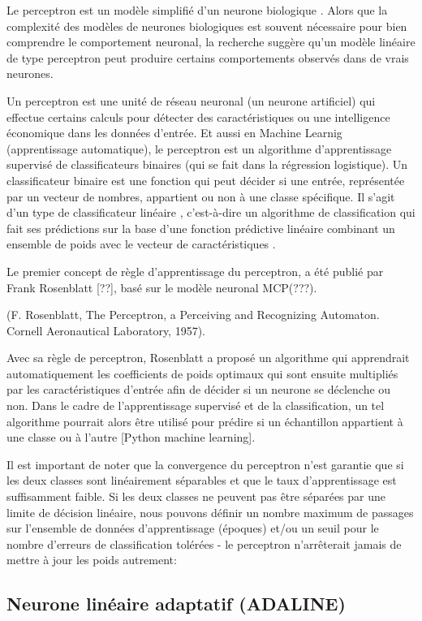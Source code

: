 	Le perceptron est un modèle simplifié d'un neurone biologique . Alors que la complexité des modèles de neurones biologiques est souvent nécessaire pour bien comprendre le comportement neuronal, la recherche suggère qu'un modèle linéaire de type perceptron peut produire certains comportements observés dans de vrais neurones.
	
	Un perceptron est une unité de réseau neuronal (un neurone artificiel) qui effectue certains calculs pour détecter des caractéristiques ou une intelligence économique dans les données d'entrée.
	Et aussi en Machine Learnig (apprentissage automatique), le perceptron est un algorithme d'apprentissage supervisé de classificateurs binaires (qui se fait dans la régression logistique). 
	Un classificateur binaire est une fonction qui peut décider si une entrée, représentée par un vecteur de nombres, appartient ou non à une classe spécifique. \cite{freund1999large} Il s'agit d'un type de classificateur linéaire , c'est-à-dire un algorithme de classification qui fait ses prédictions sur la base d'une fonction prédictive linéaire combinant un ensemble de poids avec le vecteur de caractéristiques .
	
	Le premier concept de règle d'apprentissage du perceptron, a été publié par Frank Rosenblatt [??],  basé sur le modèle neuronal MCP(???). 
	
	(F. Rosenblatt, The Perceptron, a Perceiving and Recognizing Automaton. Cornell Aeronautical Laboratory, 1957).
	
	Avec sa règle de perceptron, Rosenblatt a proposé un algorithme qui apprendrait automatiquement les coefficients de poids optimaux qui sont ensuite multipliés par les caractéristiques d'entrée afin de décider si un neurone se déclenche ou non. Dans le cadre de l'apprentissage supervisé et de la classification, un tel algorithme pourrait alors être utilisé pour prédire si un échantillon appartient à une classe ou à l'autre [Python machine learning].
	
	Il est important de noter que la convergence du perceptron n'est garantie que si les deux classes sont linéairement séparables et que le taux d'apprentissage est suffisamment faible. Si les deux classes ne peuvent pas être séparées par une limite de décision linéaire, nous pouvons définir un nombre maximum de passages sur l'ensemble de données d'apprentissage (époques) et/ou un seuil pour le nombre d'erreurs de classification tolérées - le perceptron n'arrêterait jamais de mettre à jour les poids autrement:
	
	\subsection{Neurone linéaire adaptatif (ADALINE)}
	\lipsum[1]
